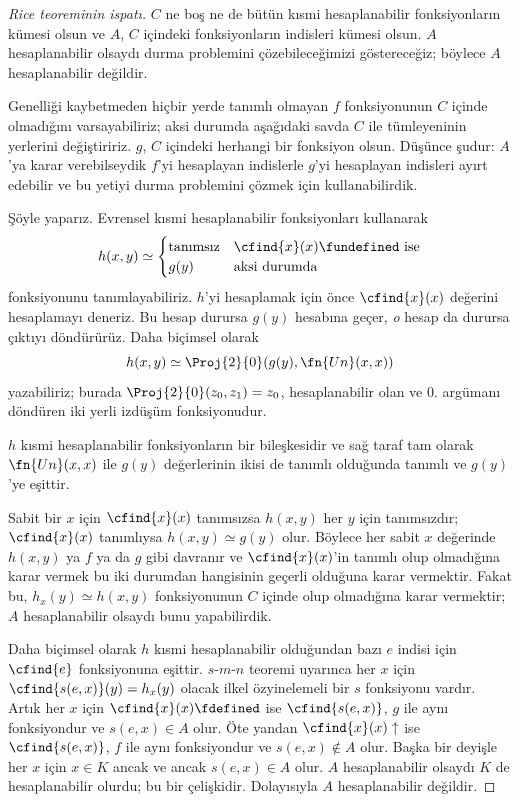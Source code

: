 \documentclass[../../../include/open-logic-section]{subfiles}
\begin{document}
\begin{proof}[Rice teoreminin ispatı]
$C$ ne boş ne de bütün kısmi hesaplanabilir fonksiyonların kümesi olsun ve
$A$, $C$ içindeki fonksiyonların indisleri kümesi olsun. $A$ hesaplanabilir
olsaydı durma problemini çözebileceğimizi göstereceğiz; böylece $A$
hesaplanabilir değildir.

Genelliği kaybetmeden hiçbir yerde tanımlı olmayan $f$ fonksiyonunun $C$
içinde olmadığını varsayabiliriz; aksi durumda aşağıdaki savda $C$ ile
tümleyeninin yerlerini değiştiririz. $g$, $C$ içindeki herhangi bir fonksiyon
olsun. Düşünce şudur: $A$'ya karar verebilseydik $f$'yi hesaplayan indislerle
$g$'yi hesaplayan indisleri ayırt edebilir ve bu yetiyi durma problemini
çözmek için kullanabilirdik.

Şöyle yaparız. Evrensel kısmi hesaplanabilir fonksiyonları kullanarak
\[
  h(x,y)\simeq\begin{cases}
    \text{tanımsız} & \text{$\cfind{x}(x)\fundefined$ ise}\\
    g(y) & \text{aksi durumda}
  \end{cases}
\]
fonksiyonunu tanımlayabiliriz. $h$'yi hesaplamak için önce
$\cfind{x}(x)$ değerini hesaplamayı deneriz. Bu hesap durursa $g(y)$
hesabına geçer, \emph{o} hesap da durursa çıktıyı döndürürüz. Daha biçimsel
olarak
\[
  h(x,y)\simeq\Proj{2}{0}(g(y),\fn{Un}(x,x))
\]
yazabiliriz; burada $\Proj{2}{0}(z_0,z_1)=z_0$, hesaplanabilir olan ve
$0$. argümanı döndüren iki yerli izdüşüm fonksiyonudur.

$h$ kısmi hesaplanabilir fonksiyonların bir bileşkesidir ve sağ taraf tam
olarak $\fn{Un}(x,x)$ ile $g(y)$ değerlerinin ikisi de tanımlı olduğunda
tanımlı ve $g(y)$'ye eşittir.

Sabit bir $x$ için $\cfind{x}(x)$ tanımsızsa $h(x,y)$ her $y$ için
tanımsızdır; $\cfind{x}(x)$ tanımlıysa $h(x,y)\simeq g(y)$ olur. Böylece
her sabit $x$ değerinde $h(x,y)$ ya $f$ ya da $g$ gibi davranır ve
$\cfind{x}(x)$'in tanımlı olup olmadığına karar vermek bu iki durumdan
hangisinin geçerli olduğuna karar vermektir. Fakat bu, $h_x(y)\simeq h(x,y)$
fonksiyonunun $C$ içinde olup olmadığına karar vermektir; $A$
hesaplanabilir olsaydı bunu yapabilirdik.

Daha biçimsel olarak $h$ kısmi hesaplanabilir olduğundan bazı $e$ indisi için
$\cfind{e}$ fonksiyonuna eşittir. $s$-$m$-$n$ teoremi uyarınca her $x$ için
$\cfind{s(e,x)}(y)=h_x(y)$ olacak ilkel özyinelemeli bir $s$ fonksiyonu
vardır. Artık her $x$ için $\cfind{x}(x)\fdefined$ ise
$\cfind{s(e,x)}$, $g$ ile aynı fonksiyondur ve $s(e,x)\in A$ olur. Öte
yandan $\cfind{x}(x)\uparrow$ ise $\cfind{s(e,x)}$, $f$ ile aynı
fonksiyondur ve $s(e,x)\notin A$ olur. Başka bir deyişle her $x$ için
$x\in K$ ancak ve ancak $s(e,x)\in A$ olur. $A$ hesaplanabilir olsaydı
$K$ de hesaplanabilir olurdu; bu bir çelişkidir. Dolayısıyla $A$
hesaplanabilir değildir.
\end{proof}
\end{document}
